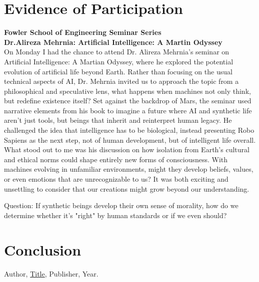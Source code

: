 \documentclass{article}
\theoremstyle{theorem}
\theoremstyle{definition}
\theoremstyle{remark}
\begin{document}
\section{Evidence of Participation}
\textbf{Fowler School of Engineering Seminar Series} \\
\textbf{Dr.Alireza Mehrnia: Artificial Intelligence: A Martin Odyssey} \\
On Monday I had the chance to attend Dr. Alireza Mehrnia’s seminar on Artificial Intelligence: A Martian Odyssey, where he explored the potential evolution of artificial life beyond Earth. Rather than focusing on the usual technical aspects of AI, Dr. Mehrnia invited us to approach the topic from a philosophical and speculative lens, what happens when machines not only think, but redefine existence itself? Set against the backdrop of Mars, the seminar used narrative elements from his book to imagine a future where AI and synthetic life aren’t just tools, but beings that inherit and reinterpret human legacy. He challenged the idea that intelligence has to be biological, instead presenting Robo Sapiens as the next step, not of human development, but of intelligent life overall. What stood out to me was his discussion on how isolation from Earth’s cultural and ethical norms could shape entirely new forms of consciousness. With machines evolving in unfamiliar environments, might they develop beliefs, values, or even emotions that are unrecognizable to us? It was both exciting and unsettling to consider that our creations might grow beyond our understanding.

Question: If synthetic beings develop their own sense of morality, how do we determine whether it's "right" by human standards or if we even should?
\section{Conclusion}\label{conclusion}

\begin{thebibliography}{99}
 Author, \href{https://en.wikipedia.org/wiki/LaTeX}{Title}, Publisher, Year.
\end{thebibliography}
\end{document}

